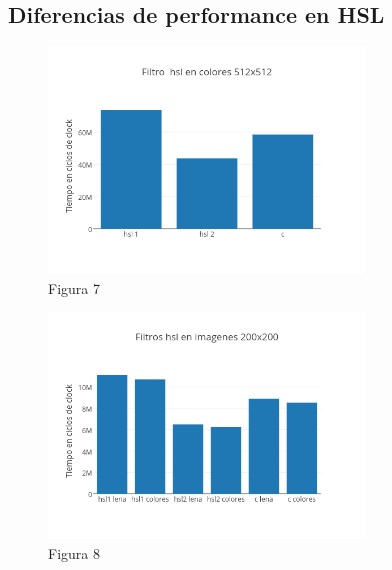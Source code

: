 \documentclass[a4paper]{article}
\begin{document}
\subsection{Diferencias de performance en HSL}

\begin{figure}[h]
  \centering
    \includegraphics[width=0.75\textwidth]{imagenes/FiltroHslEnColores512x512.png}
  \caption{Figura 7}
  \label{fig:graficohsl1}
\end{figure}
 \FloatBarrier

\begin{figure}[h]
  \centering
    \includegraphics[width=0.75\textwidth]{imagenes/FiltrosHslEnImagenes200x200.png}
  \caption{Figura 8}
  \label{fig:graficohsl2}
\end{figure}
 \FloatBarrier
\end{document}
